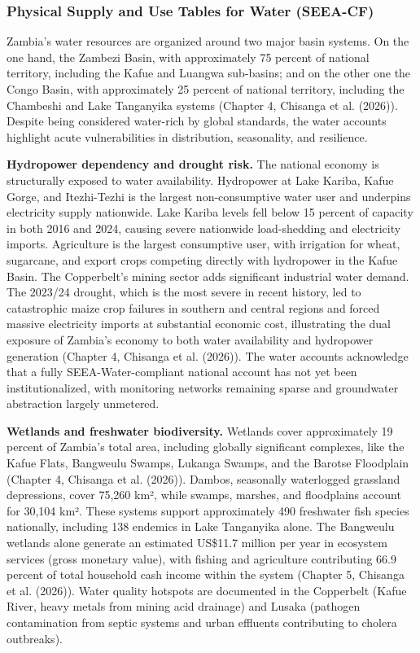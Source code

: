\documentclass[
  letterpaper,
  DIV=11,
  numbers=noendperiod]{scrartcl}
\begin{document}
\subsubsection{Physical Supply and Use Tables for Water
(SEEA-CF)}\label{physical-supply-and-use-tables-for-water-seea-cf-2}

Zambia's water resources are organized around two major basin systems.
On the one hand, the Zambezi Basin, with approximately 75 percent of
national territory, including the Kafue and Luangwa sub-basins; and on
the other one the Congo Basin, with approximately 25 percent of national
territory, including the Chambeshi and Lake Tanganyika systems (Chapter
4, Chisanga et al. (2026)). Despite being considered water-rich by
global standards, the water accounts highlight acute vulnerabilities in
distribution, seasonality, and resilience.

\textbf{Hydropower dependency and drought risk.} The national economy is
structurally exposed to water availability. Hydropower at Lake Kariba,
Kafue Gorge, and Itezhi-Tezhi is the largest non-consumptive water user
and underpins electricity supply nationwide. Lake Kariba levels fell
below 15 percent of capacity in both 2016 and 2024, causing severe
nationwide load-shedding and electricity imports. Agriculture is the
largest consumptive user, with irrigation for wheat, sugarcane, and
export crops competing directly with hydropower in the Kafue Basin. The
Copperbelt's mining sector adds significant industrial water demand. The
2023/24 drought, which is the most severe in recent history, led to
catastrophic maize crop failures in southern and central regions and
forced massive electricity imports at substantial economic cost,
illustrating the dual exposure of Zambia's economy to both water
availability and hydropower generation (Chapter 4, Chisanga et al.
(2026)). The water accounts acknowledge that a fully
SEEA-Water-compliant national account has not yet been
institutionalized, with monitoring networks remaining sparse and
groundwater abstraction largely unmetered.

\textbf{Wetlands and freshwater biodiversity.} Wetlands cover
approximately 19 percent of Zambia's total area, including globally
significant complexes, like the Kafue Flats, Bangweulu Swamps, Lukanga
Swamps, and the Barotse Floodplain (Chapter 4, Chisanga et al. (2026)).
Dambos, seasonally waterlogged grassland depressions, cover 75,260 km²,
while swamps, marshes, and floodplains account for 30,104 km². These
systems support approximately 490 freshwater fish species nationally,
including 138 endemics in Lake Tanganyika alone. The Bangweulu wetlands
alone generate an estimated US\$11.7 million per year in ecosystem
services (gross monetary value), with fishing and agriculture
contributing 66.9 percent of total household cash income within the
system (Chapter 5, Chisanga et al. (2026)). Water quality hotspots are
documented in the Copperbelt (Kafue River, heavy metals from mining acid
drainage) and Lusaka (pathogen contamination from septic systems and
urban effluents contributing to cholera outbreaks).
\end{document}
